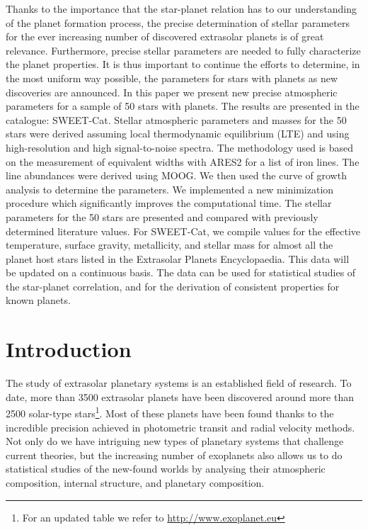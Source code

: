 \documentclass{aa}
\begin{document}
\abstract
{Thanks to the importance that the star-planet relation has to our understanding
of the planet formation process, the precise determination of stellar parameters
for the ever increasing number of discovered extrasolar planets is of great
relevance. Furthermore, precise stellar parameters are needed to fully
characterize the planet properties. It is thus important to continue the efforts
to determine, in the most uniform way possible, the parameters for stars with
planets as new discoveries are announced.}
{In this paper we present new precise atmospheric parameters for a sample of 50
stars with planets. The results are presented in the catalogue: SWEET-Cat.}
{Stellar atmospheric parameters and masses for the 50 stars were derived
assuming local thermodynamic equilibrium (LTE) and using high-resolution and
high signal-to-noise spectra. The methodology used is based on the measurement
of equivalent widths with ARES2 for a list of iron lines. The line
abundances were derived using MOOG. We then used the curve of growth analysis to
determine the parameters. We implemented a new minimization procedure which
significantly improves the computational time.}
{The stellar parameters for the 50 stars are presented and compared with
previously determined literature values. For SWEET-Cat, we compile values
for the effective temperature, surface gravity, metallicity, and stellar mass
for almost all the planet host stars listed in the Extrasolar Planets
Encyclopaedia. This data will be updated on a continuous basis. The data can be
used for statistical studies of the star-planet correlation, and for the
derivation of consistent properties for known planets.}
{}


\maketitle



\section{Introduction}
\label{sec:introduction}
The study of extrasolar planetary systems is an established field of research.
To date, more than 3500 extrasolar planets have been discovered around more than
2500 solar-type stars\footnote{For an updated table we refer to
\url{http://www.exoplanet.eu}}. Most of these planets have been found thanks to the
incredible precision achieved in photometric transit and radial velocity
methods. Not only do we have intriguing new types of planetary systems that
challenge current theories, but the increasing number of exoplanets also allows us
to do statistical studies of the new-found worlds by analysing their atmospheric
composition, internal structure, and planetary composition.
\end{document}
